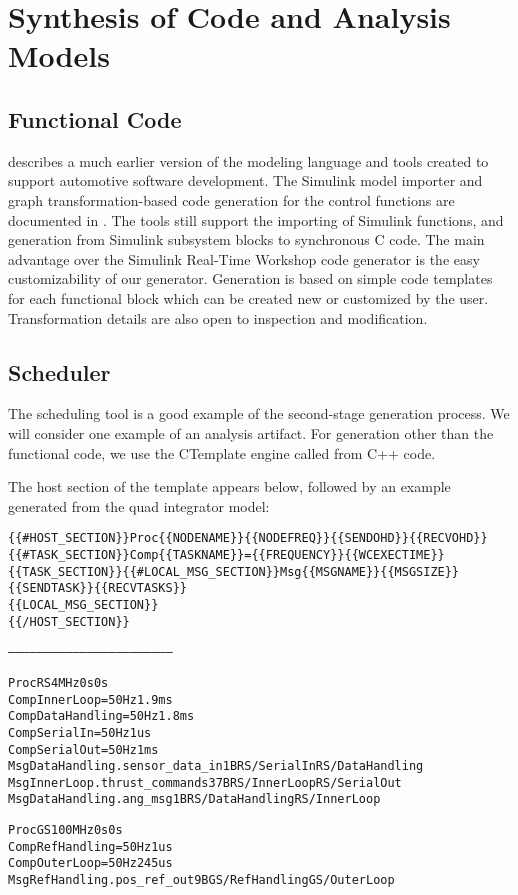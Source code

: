 \section{Synthesis of Code and Analysis Models}

\subsection{Functional Code}

\cite{mic:ecsldp} describes a much earlier version of the modeling language and
tools created to support automotive software development.  The Simulink model
importer and graph transformation-based code generation for the control
functions are documented in \cite{mic:ecsldp}.  The tools still support the
importing of Simulink functions, and generation from Simulink subsystem blocks
to synchronous C code.  The main advantage over the Simulink Real-Time Workshop
code generator \cite{tools:mathworks} is the easy customizability of our
generator.  Generation is based on simple code templates for each functional
block which can be created new or customized by the user.  Transformation details
are also open to inspection and modification.

\subsection{Scheduler}

The scheduling tool is a good example of the second-stage generation
process.  We will consider one example of an analysis artifact.  For generation other than the
functional code, we use the CTemplate engine\cite{tools:ctemplate} called from C++
code.

The host section of the template appears below, followed by an example
generated from the quad integrator model:

\newpage

\begin{alltt}
\scriptsize
\{\{\#HOST_SECTION\}\} Proc \{\{NODENAME\}\}\{\{NODEFREQ\}\}\{\{SENDOHD\}\}\{\{RECVOHD\}\}
\{\{\#TASK_SECTION\}\}Comp \{\{TASKNAME\}\} = \{\{FREQUENCY\}\}\{\{WCEXECTIME\}\}
\{\{\/TASK_SECTION\}\}\{\{\#LOCAL_MSG_SECTION\}\}Msg \{\{MSGNAME\}\} \{\{MSGSIZE\}\} \{\{SENDTASK\}\}\{\{RECVTASKS\}\}
\{\{\/LOCAL_MSG_SECTION\}\}
\{\{/HOST_SECTION\}\}

---------------------------------------------------------------------

Proc RS 4MHz 0s 0s
Comp InnerLoop =50Hz 1.9ms
Comp DataHandling =50Hz 1.8ms
Comp SerialIn =50Hz 1us
Comp SerialOut =50Hz 1ms
Msg DataHandling.sensor_data_in 1B RS/SerialIn RS/DataHandling 
Msg InnerLoop.thrust_commands 37B RS/InnerLoop RS/SerialOut
Msg DataHandling.ang_msg 1B RS/DataHandling RS/InnerLoop 

Proc GS 100MHz 0s 0s
Comp RefHandling =50Hz 1us
Comp OuterLoop =50Hz 245us
Msg RefHandling.pos_ref_out 9B GS/RefHandling GS/OuterLoop
\end{alltt}

